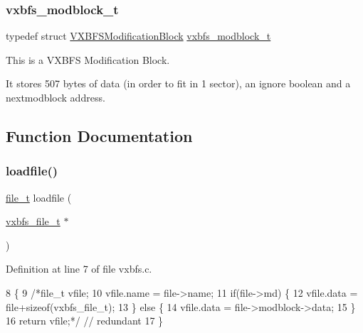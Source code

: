 \subsubsection{\texorpdfstring{vxbfs\+\_\+modblock\+\_\+t}{vxbfs\_modblock\_t}}
{\footnotesize\ttfamily typedef struct \hyperlink{a00326}{V\+X\+B\+F\+S\+Modification\+Block}  \hyperlink{a00200_a0774a42f7a124b6d3054ccabd4d35463_a0774a42f7a124b6d3054ccabd4d35463}{vxbfs\+\_\+modblock\+\_\+t}}



This is a V\+X\+B\+FS Modification Block. 

It stores 507 bytes of data (in order to fit in 1 sector), an ignore boolean and a nextmodblock address. 

\subsection{Function Documentation}
\mbox{\label{a00200_a056a7e9a594275f19bd99150a92f266a_a056a7e9a594275f19bd99150a92f266a}} 
\subsubsection{\texorpdfstring{loadfile()}{loadfile()}}
{\footnotesize\ttfamily \hyperlink{a00185_aa5445a6474a23ee3e7756d432dfa4ba1_aa5445a6474a23ee3e7756d432dfa4ba1}{file\+\_\+t} loadfile (\begin{DoxyParamCaption}\item[{\hyperlink{a00200_abb93e2407af0d8fe0f5629ce6456c6f9_abb93e2407af0d8fe0f5629ce6456c6f9}{vxbfs\+\_\+file\+\_\+t} $\ast$}]{ }\end{DoxyParamCaption})}



Definition at line 7 of file vxbfs.\+c.


\begin{DoxyCode}
8 \{
9     \textcolor{comment}{/*file\_t vfile;}
10 \textcolor{comment}{    vfile.name = file->name;}
11 \textcolor{comment}{    if(file->md) \{}
12 \textcolor{comment}{        vfile.data = file+sizeof(vxbfs\_file\_t);}
13 \textcolor{comment}{    \} else \{}
14 \textcolor{comment}{        vfile.data = file->modblock->data;}
15 \textcolor{comment}{    \}}
16 \textcolor{comment}{    return vfile;*/} \textcolor{comment}{// redundant}
17 \}
\end{DoxyCode}
\mbox{\label{a00200_a092e5bdd19e8369aa33901fffeb1f025_a092e5bdd19e8369aa33901fffeb1f025}} 

